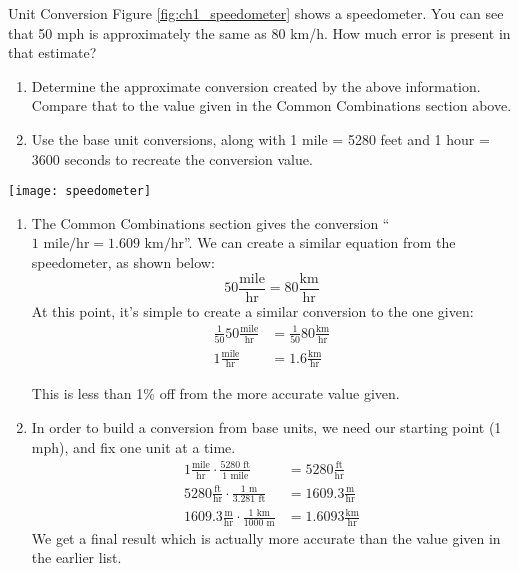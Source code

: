 \begin{example}{Unit Conversion}
Figure \ref{fig:ch1_speedometer} shows a speedometer.  You can see that 50 mph is approximately the same as 80 km/h.  How much error is present in that estimate?

\begin{enumerate}
\item Determine the approximate conversion created by the above information. Compare that to the value given in the Common Combinations section above.
\item Use the base unit conversions, along with 1 mile = 5280 feet and 1 hour = 3600 seconds to recreate the conversion value.
\end{enumerate}
\begin{center}
\texttt{[image: speedometer]}
\label{fig:ch1_speedometer}
\end{center}
\begin{enumerate}
\item The Common Combinations section gives the conversion ``$1 \text{ mile/hr} =  1.609 \text{ km/hr}$''.  We can create a similar equation from the speedometer, as shown below:
\begin{equation*}
50 \frac{\text{mile}}{\text{hr}} = 80 \frac{\text{km}}{\text{hr}}
\end{equation*}
At this point, it's simple to create a similar conversion to the one given:
\begin{align*}
\frac{1}{50}50 \frac{\text{mile}}{\text{hr}} &= \frac{1}{50}80 \frac{\text{km}}{\text{hr}}\\
1 \frac{\text{mile}}{\text{hr}} &= 1.6 \frac{\text{km}}{\text{hr}}
\end{align*}

This is less than 1\% off from the more accurate value given.

\item In order to build a conversion from base units, we need our starting point (1 mph), and fix one unit at a time.
\begin{align*}
1 \frac{\text{mile}}{\text{hr}} \cdot \frac{5280 \text{ ft}}{1\text{ mile}} &= 5280 \frac{\text{ft}}{\text{hr}} \\
5280 \frac{\text{ft}}{\text{hr}} \cdot \frac{1\text{ m}}{3.281 \text{ ft}} &= 1609.3 \frac{\text{m}}{\text{hr}} \\
1609.3 \frac{\text{m}}{\text{hr}} \cdot \frac{1 \text{ km}}{1000 \text{ m}} &= 1.6093 \frac{\text{km}}{\text{hr}}
\end{align*}
We get a final result which is actually more accurate than the value given in the earlier list.
\end{enumerate}
\end{example}

